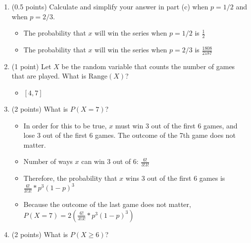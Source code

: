 \documentclass[11pt]{article}
\newcommand{\Range}{{\mathrm{Range}}}
\begin{document}
\begin{enumerate}
\begin{enumerate}
\item (0.5 points) Calculate and simplify your answer in part (c) when $p=1/2$
and when $p=2/3$.

\begin{itemize}
	\item The probability that $x$ will win the series when $p=1/2$ is 
	$\frac{1}{2}$
	\item The probability that $x$ will win the series when $p=2/3$ is
	$\frac{1808}{2187}$
\end{itemize}

\item (1 point) Let $X$ be the random variable that counts the number of games
that are played.  What is $\Range(X)$?

\begin{itemize}
	\item $[4, 7]$
\end{itemize}

\item (2 points) What is $P(X=7)$?

\begin{itemize}
	\item In order for this to be true, $x$ must win 3 out of the first 6 games,
	and lose 3 out of the first 6 games. The outcome of the 7th game does not 
	matter.
	\item Number of ways $x$ can win 3 out of 6: $\frac{6!}{3!3!}$
	\item Therefore, the probability that $x$ wins 3 out of the first 6 games is
	$\frac{6!}{3!3!} * p^{3}(1-p)^{3}$
	\item Because the outcome of the last game does not matter,$P(X=7) = 
	2(\frac{6!}{3!3!} * p^{3}(1-p)^{3})$
\end{itemize}

\item (2 points) What is $P(X\geq 6)$?


\end{enumerate}
\end{enumerate}
\end{document}
